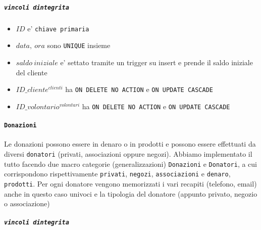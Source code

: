\documentclass[]{article}
\providecommand{\tightlist}{%
  \setlength{\itemsep}{0pt}\setlength{\parskip}{0pt}}
\let\oldparagraph\paragraph
\renewcommand{\paragraph}[1]{\oldparagraph{#1}\mbox{}}
\let\oldsubparagraph\subparagraph
\renewcommand{\subparagraph}[1]{\oldsubparagraph{#1}\mbox{}}
\begin{document}
\hypertarget{vincoli-dintegrita-3}{%
\subparagraph{\texorpdfstring{\texttt{vincoli\ d\textquotesingle{}integrita\textquotesingle{}}}{vincoli d'integrita'}}\label{vincoli-dintegrita-3}}

\begin{itemize}
\tightlist
\item
  \(ID\) e' \texttt{chiave\ primaria}
\item
  \(data,\ ora\) sono \texttt{UNIQUE} insieme
\item
  \(saldo\ iniziale\) e' settato tramite un trigger su insert e prende
  il saldo iniziale del cliente
\item
  \(ID\_cliente^{clienti}\) ha \texttt{ON\ DELETE\ NO\ ACTION} e
  \texttt{ON\ UPDATE\ CASCADE}
\item
  \(ID\_volontario^{volontari}\) ha \texttt{ON\ DELETE\ NO\ ACTION} e
  \texttt{ON\ UPDATE\ CASCADE}
\end{itemize}

\hypertarget{donazioni}{%
\paragraph{\texorpdfstring{\texttt{Donazioni}}{Donazioni}}\label{donazioni}}

Le donazioni possono essere in denaro o in prodotti e possono essere
effettuati da diversi \texttt{donatori} (privati, associazioni oppure
negozi). Abbiamo implementato il tutto facendo due macro categorie
(generalizzazioni) \texttt{Donazioni} e \texttt{Donatori}, a cui
corrispondono rispettivamente \texttt{privati}, \texttt{negozi},
\texttt{associazioni} e \texttt{denaro}, \texttt{prodotti}. Per ogni
donatore vengono memorizzati i vari recapiti (telefono, email) anche in
questo caso univoci e la tipologia del donatore (appunto privato,
negozio o associazione)

\hypertarget{vincoli-dintegrita-4}{%
\subparagraph{\texorpdfstring{\texttt{vincoli\ d\textquotesingle{}integrita\textquotesingle{}}}{vincoli d'integrita'}}\label{vincoli-dintegrita-4}}
\end{document}
